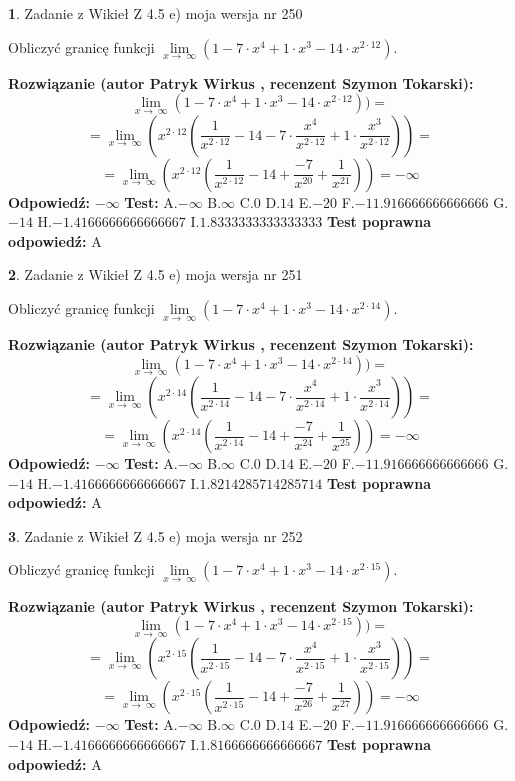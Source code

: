 \documentclass[12pt, a4paper]{article}
\theoremstyle{definition} %
\newtheorem{zad}{}
\newcommand{\zadStart}[1]{\begin{zad}#1\newline}
\newcommand{\zadStop}{\end{zad}}
\newcommand{\rozwStart}[2]{\noindent \textbf{Rozwiązanie (autor #1 , recenzent #2): }\newline}
\newcommand{\rozwStop}{\newline}
\newcommand{\odpStart}{\noindent \textbf{Odpowiedź:}\newline}
\newcommand{\odpStop}{\newline}
\newcommand{\testStart}{\noindent \textbf{Test:}\newline}
\newcommand{\testStop}{\newline}
\newcommand{\kluczStart}{\noindent \textbf{Test poprawna odpowiedź:}\newline}
\newcommand{\kluczStop}{\newline}
\begin{document}
\zadStart{Zadanie z Wikieł Z 4.5 e) moja wersja nr 250}


Obliczyć granicę funkcji  $\lim\limits_{x\to\ \infty}(1 - 7 \cdot x^{4}+1 \cdot x^{3}- 14 \cdot x^{2\cdot12})$.
\zadStop
\rozwStart{Patryk Wirkus}{Szymon Tokarski}
$$\lim\limits_{x\to\ \infty}(1 - 7 \cdot x^{4}+1 \cdot x^{3}- 14 \cdot x^{2\cdot12}))=$$
$$=\lim\limits_{x\to\ \infty}(x^{2\cdot12}(\frac{1}{x^{2\cdot12}}-14 -7 \cdot \frac{x^{4}}{x^{2\cdot12}}+1 \cdot \frac{x^{3}}{x^{2\cdot12}}))=$$
$$=\lim\limits_{x\to\ \infty}(x^{2\cdot12}(\frac{1}{x^{2\cdot12}}-14 + \frac{-7}{x^{20}}+ \frac{1}{x^{21}}))=-\infty$$
\rozwStop
\odpStart
$-\infty$
\odpStop
\testStart
A.$-\infty$ B.$\infty$ C.$0$ D.$14$ E.$-20$
F.$-11.916666666666666$ G.$-14$
H.$-1.4166666666666667$
I.$1.8333333333333333$
\testStop
\kluczStart
A
\kluczStop



\zadStart{Zadanie z Wikieł Z 4.5 e) moja wersja nr 251}


Obliczyć granicę funkcji  $\lim\limits_{x\to\ \infty}(1 - 7 \cdot x^{4}+1 \cdot x^{3}- 14 \cdot x^{2\cdot14})$.
\zadStop
\rozwStart{Patryk Wirkus}{Szymon Tokarski}
$$\lim\limits_{x\to\ \infty}(1 - 7 \cdot x^{4}+1 \cdot x^{3}- 14 \cdot x^{2\cdot14}))=$$
$$=\lim\limits_{x\to\ \infty}(x^{2\cdot14}(\frac{1}{x^{2\cdot14}}-14 -7 \cdot \frac{x^{4}}{x^{2\cdot14}}+1 \cdot \frac{x^{3}}{x^{2\cdot14}}))=$$
$$=\lim\limits_{x\to\ \infty}(x^{2\cdot14}(\frac{1}{x^{2\cdot14}}-14 + \frac{-7}{x^{24}}+ \frac{1}{x^{25}}))=-\infty$$
\rozwStop
\odpStart
$-\infty$
\odpStop
\testStart
A.$-\infty$ B.$\infty$ C.$0$ D.$14$ E.$-20$
F.$-11.916666666666666$ G.$-14$
H.$-1.4166666666666667$
I.$1.8214285714285714$
\testStop
\kluczStart
A
\kluczStop



\zadStart{Zadanie z Wikieł Z 4.5 e) moja wersja nr 252}


Obliczyć granicę funkcji  $\lim\limits_{x\to\ \infty}(1 - 7 \cdot x^{4}+1 \cdot x^{3}- 14 \cdot x^{2\cdot15})$.
\zadStop
\rozwStart{Patryk Wirkus}{Szymon Tokarski}
$$\lim\limits_{x\to\ \infty}(1 - 7 \cdot x^{4}+1 \cdot x^{3}- 14 \cdot x^{2\cdot15}))=$$
$$=\lim\limits_{x\to\ \infty}(x^{2\cdot15}(\frac{1}{x^{2\cdot15}}-14 -7 \cdot \frac{x^{4}}{x^{2\cdot15}}+1 \cdot \frac{x^{3}}{x^{2\cdot15}}))=$$
$$=\lim\limits_{x\to\ \infty}(x^{2\cdot15}(\frac{1}{x^{2\cdot15}}-14 + \frac{-7}{x^{26}}+ \frac{1}{x^{27}}))=-\infty$$
\rozwStop
\odpStart
$-\infty$
\odpStop
\testStart
A.$-\infty$ B.$\infty$ C.$0$ D.$14$ E.$-20$
F.$-11.916666666666666$ G.$-14$
H.$-1.4166666666666667$
I.$1.8166666666666667$
\testStop
\kluczStart
A
\kluczStop
\end{document}
